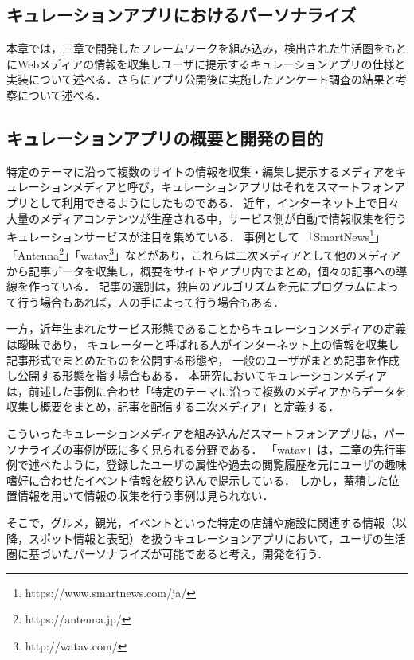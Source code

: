 \documentclass[a4paper]{jsarticle}
\begin{document}
\begin{enumerate}
\begin{enumerate}


\section{キュレーションアプリにおけるパーソナライズ}
本章では，三章で開発したフレームワークを組み込み，検出された生活圏をもとにWebメディアの情報を収集しユーザに提示するキュレーションアプリの仕様と実装について述べる．さらにアプリ公開後に実施したアンケート調査の結果と考察について述べる．


\subsection{キュレーションアプリの概要と開発の目的}
特定のテーマに沿って複数のサイトの情報を収集・編集し提示するメディアをキュレーションメディアと呼び，キュレーションアプリはそれをスマートフォンアプリとして利用できるようにしたものである．
近年，インターネット上で日々大量のメディアコンテンツが生産される中，サービス側が自動で情報収集を行うキュレーションサービスが注目を集めている\cite{ohmukai}．
事例として
「SmartNews\footnote{https://www.smartnews.com/ja/}」「Antenna\footnote{https://antenna.jp/}」「watav\footnote{http://watav.com/}」などがあり，これらは二次メディアとして他のメディアから記事データを収集し，概要をサイトやアプリ内でまとめ，個々の記事への導線を作っている．
記事の選別は，独自のアルゴリズムを元にプログラムによって行う場合もあれば，人の手によって行う場合もある．

一方，近年生まれたサービス形態であることからキュレーションメディアの定義は曖昧であり，
キュレーターと呼ばれる人がインターネット上の情報を収集し記事形式でまとめたものを公開する形態や，
一般のユーザがまとめ記事を作成し公開する形態を指す場合もある．
本研究においてキュレーションメディアは，前述した事例に合わせ「特定のテーマに沿って複数のメディアからデータを収集し概要をまとめ，記事を配信する二次メディア」と定義する．

こういったキュレーションメディアを組み込んだスマートフォンアプリは，パーソナライズの事例が既に多く見られる分野である．
「watav」は，二章の先行事例で述べたように，登録したユーザの属性や過去の閲覧履歴を元にユーザの趣味嗜好に合わせたイベント情報を絞り込んで提示している．
しかし，蓄積した位置情報を用いて情報の収集を行う事例は見られない．

そこで，グルメ，観光，イベントといった特定の店舗や施設に関連する情報（以降，スポット情報と表記）を扱うキュレーションアプリにおいて，ユーザの生活圏に基づいたパーソナライズが可能であると考え，開発を行う．



\end{enumerate}
\end{enumerate}
\end{document}
